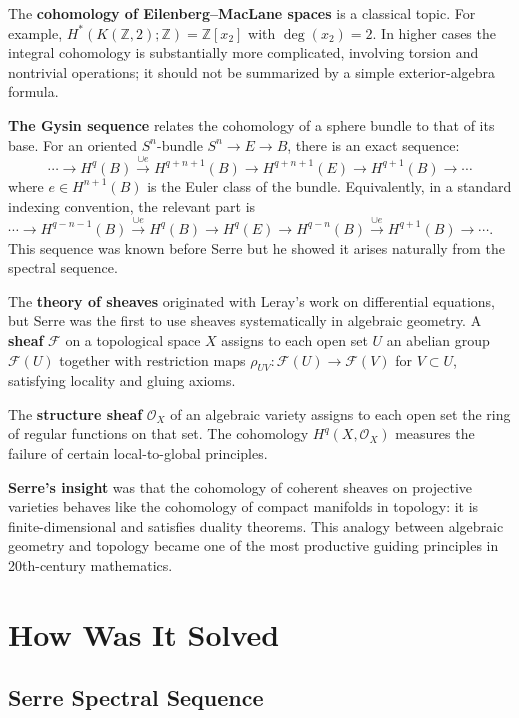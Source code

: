 The \textbf{cohomology of Eilenberg--MacLane spaces} is a classical topic. For example, $H^*(K(\mathbb{Z}, 2); \mathbb{Z}) = \mathbb{Z}[x_2]$ with $\deg(x_2) = 2$. In higher cases the integral cohomology is substantially more complicated, involving torsion and nontrivial operations; it should not be summarized by a simple exterior-algebra formula.

\textbf{The Gysin sequence} relates the cohomology of a sphere bundle to that of its base. For an oriented $S^n$-bundle $S^n \to E \to B$, there is an exact sequence:
\[ \cdots \to H^q(B) \xrightarrow{\cup e} H^{q+n+1}(B) \to H^{q+n+1}(E) \to H^{q+1}(B) \to \cdots \]
where $e \in H^{n+1}(B)$ is the Euler class of the bundle. Equivalently, in a standard indexing convention, the relevant part is $\cdots\to H^{q-n-1}(B)\xrightarrow{\cup e}H^q(B)\to H^q(E)\to H^{q-n}(B)\xrightarrow{\cup e}H^{q+1}(B)\to\cdots$. This sequence was known before Serre but he showed it arises naturally from the spectral sequence.

The \textbf{theory of sheaves} originated with Leray's work on differential equations, but Serre was the first to use sheaves systematically in algebraic geometry. A \textbf{sheaf} $\mathcal{F}$ on a topological space $X$ assigns to each open set $U$ an abelian group $\mathcal{F}(U)$ together with restriction maps $\rho_{UV}: \mathcal{F}(U) \to \mathcal{F}(V)$ for $V \subset U$, satisfying locality and gluing axioms.

The \textbf{structure sheaf} $\mathcal{O}_X$ of an algebraic variety assigns to each open set the ring of regular functions on that set. The cohomology $H^q(X, \mathcal{O}_X)$ measures the failure of certain local-to-global principles.

\textbf{Serre's insight} was that the cohomology of coherent sheaves on projective varieties behaves like the cohomology of compact manifolds in topology: it is finite-dimensional and satisfies duality theorems. This analogy between algebraic geometry and topology became one of the most productive guiding principles in 20th-century mathematics.

\section{How Was It Solved}

\subsection{Serre Spectral Sequence}

